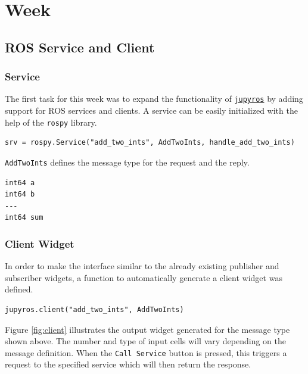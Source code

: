 \chapter{Week} %


\section{ROS Service and Client}

    \subsection{Service}
        The first task for this week was to expand the functionality of \href{https://github.com/RoboStack/jupyter-ros}{\texttt{jupyros}} by adding support for ROS services and clients. A service can be easily initialized with the help of the \texttt{rospy} library.
        
        \begin{lstlisting}
srv = rospy.Service("add_two_ints", AddTwoInts, handle_add_two_ints)
        \end{lstlisting}
        
        \noindent\texttt{AddTwoInts} defines the message type for the request and the reply. 
        
        \begin{lstlisting}
int64 a
int64 b
---
int64 sum
        \end{lstlisting}
    
    \subsection{Client Widget}
    
        In order to make the interface similar to the already existing publisher and subscriber widgets, a function to automatically generate a client widget was defined. 
    
        \begin{lstlisting}
jupyros.client("add_two_ints", AddTwoInts)
        \end{lstlisting}
        
        \noindent Figure \ref{fig:client} illustrates the output widget generated for the message type shown above. The number and type of input cells will vary depending on the message definition. When the \texttt{Call Service} button is pressed, this triggers a request to the specified service which will then return the response.
        
